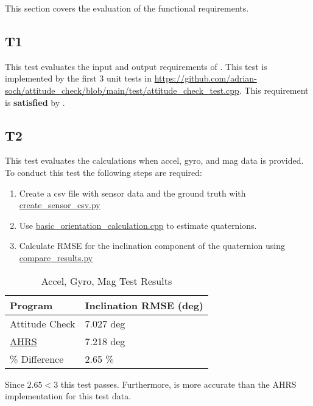 \documentclass[12pt, titlepage]{article}
\begin{document}
This section covers the evaluation of the functional requirements.

\subsection{T1} This test evaluates the input and output requirements of \progname{}. This test is
implemented by the first 3 unit tests in
\url{https://github.com/adrian-soch/attitude_check/blob/main/test/attitude_check_test.cpp}. This
requirement is \textbf{satisfied} by \progname{}.

\subsection{T2}\label{t2}

This test evaluates the calculations when accel, gyro, and mag data is provided. To conduct this
test the following steps are required:
\begin{enumerate}
  \item Create a csv file with sensor data and the ground truth with
  \href{https://github.com/adrian-soch/attitude_check/blob/main/scripts/create_sensor_csv.py}{create\_sensor\_csv.py}
  \item Use
  \href{https://github.com/adrian-soch/attitude_check/blob/main/examples/basic_orientation_calculation.cpp}{basic\_orientation\_calculation.cpp}
  to estimate quaternions.
  \item Calculate RMSE for the inclination component of the quaternion using
  \href{https://github.com/adrian-soch/attitude_check/blob/main/scripts/compare_results.py}{compare\_results.py}
\end{enumerate}

\begin{table}[H]
    \centering
    \caption{Accel, Gyro, Mag Test Results}
    \label{tab:my-table}
    \begin{tabular}{|l|l|}
    \hline
    Program        & Inclination RMSE (deg) \\ \hline
    Attitude Check & 7.027 deg              \\ \hline
    \href{https://ahrs.readthedocs.io/en/latest/filters/madgwick.html}{AHRS} & 7.218 deg \\ \hline
    \hline
    \% Difference  & 2.65 \%                \\ \hline
    \end{tabular}
\end{table}

Since $2.65 < 3$ this test passes. Furthermore, \progname{} is more accurate than the AHRS implementation for this test data.
\end{document}
